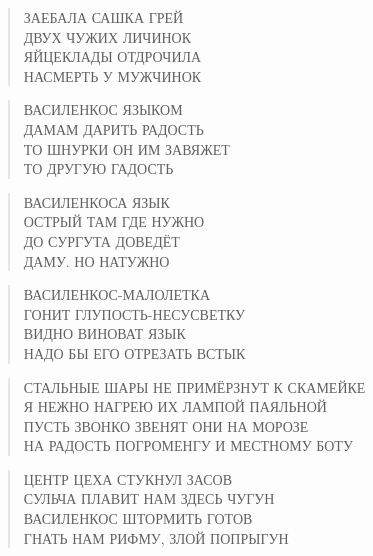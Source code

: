 \poemtitle{***}
\begin{verse}
ЗАЕБАЛА САШКА ГРЕЙ\\
ДВУХ ЧУЖИХ ЛИЧИНОК\\
ЯЙЦЕКЛАДЫ ОТДРОЧИЛА\\
НАСМЕРТЬ У МУЖЧИНОК
\end{verse}

\poemtitle{***}
\begin{verse}
ВАСИЛЕНКОС ЯЗЫКОМ\\
ДАМАМ ДАРИТЬ РАДОСТЬ\\
ТО ШНУРКИ ОН ИМ ЗАВЯЖЕТ\\
ТО ДРУГУЮ ГАДОСТЬ
\end{verse}

\poemtitle{***}
\begin{verse}
ВАСИЛЕНКОСА ЯЗЫК\\
ОСТРЫЙ ТАМ ГДЕ НУЖНО\\
ДО СУРГУТА ДОВЕДЁТ\\
ДАМУ. НО НАТУЖНО
\end{verse}

\poemtitle{***}
\begin{verse}
ВАСИЛЕНКОС-МАЛОЛЕТКА\\
ГОНИТ ГЛУПОСТЬ-НЕСУСВЕТКУ\\
ВИДНО ВИНОВАТ ЯЗЫК\\
НАДО БЫ ЕГО ОТРЕЗАТЬ ВСТЫК
\end{verse}

\poemtitle{***}
\begin{verse}
СТАЛЬНЫЕ ШАРЫ НЕ ПРИМЁРЗНУТ К СКАМЕЙКЕ\\
Я НЕЖНО НАГРЕЮ ИХ ЛАМПОЙ ПАЯЛЬНОЙ\\
ПУСТЬ ЗВОНКО ЗВЕНЯТ ОНИ НА МОРОЗЕ\\
НА РАДОСТЬ ПОГРОМЕНГУ И МЕСТНОМУ БОТУ
\end{verse}

\poemtitle{***}
\begin{verse}
ЦЕНТР ЦЕХА СТУКНУЛ ЗАСОВ\\
СУЛЬЧА ПЛАВИТ НАМ ЗДЕСЬ ЧУГУН\\
ВАСИЛЕНКОС ШТОРМИТЬ ГОТОВ\\
ГНАТЬ НАМ РИФМУ, ЗЛОЙ ПОПРЫГУН
\end{verse}

